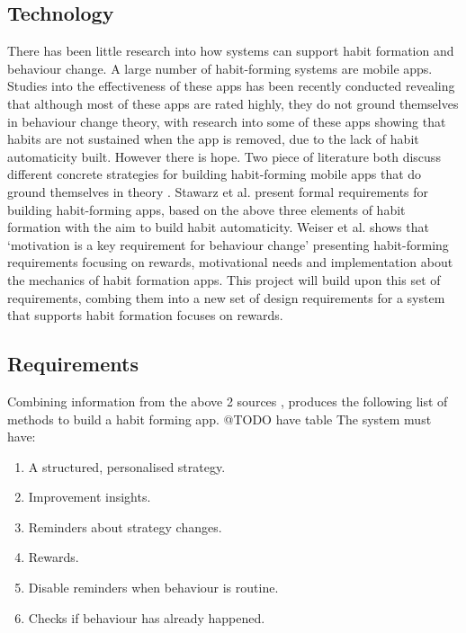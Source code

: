 \subsection{Technology}
There has been little research into how systems can support habit formation and behaviour change. A large number of habit-forming systems are mobile apps. Studies into the effectiveness of these apps has been recently conducted \cite{article_dont_kick_habit, article_beyond_self_tracking_designing_apps} revealing that although most of these apps are rated highly, they do not ground themselves in behaviour change theory, with research into some of these apps showing that habits are not sustained when the app is removed, due to the lack of habit automaticity built.\newline
\newline
However there is hope. Two piece of literature both discuss different concrete strategies for building habit-forming mobile apps that do ground themselves in theory \cite{article_beyond_self_tracking_designing_apps, article_taxonomy_motivational_affordances_meaningful}. Stawarz et al. \cite{article_beyond_self_tracking_designing_apps} present formal requirements for building habit-forming apps, based on the above three elements of habit formation with the aim to build habit automaticity. Weiser et al. \cite{article_taxonomy_motivational_affordances_meaningful} shows that `motivation is a key requirement for behaviour change' presenting habit-forming requirements focusing on rewards, motivational needs and implementation about the mechanics of habit formation apps. This project will build upon this set of requirements, combing them into a new set of design requirements for a system that supports habit formation focuses on rewards.

\subsection{Requirements}
Combining information from the above 2 sources \cite{article_beyond_self_tracking_designing_apps, article_taxonomy_motivational_affordances_meaningful}, produces the following list of methods to build a habit forming app.\newline
@TODO have table
\newline
The system must have:

\begin{enumerate}
  \item A structured, personalised strategy.
  \item Improvement insights.
  \item Reminders about strategy changes.
  \item Rewards.
  \item Disable reminders when behaviour is routine.
  \item Checks if behaviour has already happened.
\end{enumerate}

